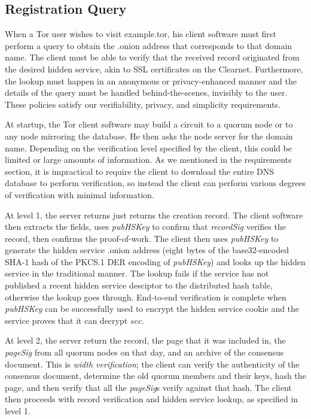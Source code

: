 \subsection{Registration Query}

When a Tor user wishes to visit example.tor, his client software must first perform a query to obtain the .onion address that corresponds to that domain name. The client must be able to verify that the received record originated from the desired hidden service, akin to SSL certificates on the Clearnet. Furthermore, the lookup must happen in an anonymous or privacy-enhanced manner and the details of the query must be handled behind-the-scenes, invisibly to the user. These policies satisfy our verifiability, privacy, and simplicity requirements.

At startup, the Tor client software may build a circuit to a quorum node or to any node mirroring the database. He then asks the node server for the domain name. Depending on the verification level specified by the client, this could be limited or large amounts of information. As we mentioned in the requirements section, it is impractical to require the client to download the entire DNS database to perform verification, so instead the client can perform various degrees of verification with minimal information.

At level 1, the server returns just returns the creation record. The client software then extracts the fields, uses \emph{pubHSKey} to confirm that \emph{recordSig} verifies the record, then confirms the proof-of-work. The client then uses \emph{pubHSKey} to generate the hidden service .onion address (eight bytes of the base32-encoded SHA-1 hash of the PKCS.1 DER encoding of \emph{pubHSKey}) and looks up the hidden service in the traditional manner. The lookup fails if the service has not published a recent hidden service desciptor to the distributed hash table, otherwise the lookup goes through. End-to-end verification is complete when \emph{pubHSKey} can be successfully used to encrypt the hidden service cookie and the service proves that it can decrypt $ sec $.

At level 2, the server return the record, the page that it was included in, the \emph{pageSig} from all quorum nodes on that day, and an archive of the consensus document. This is \emph{width verification}; the client can verify the authenticity of the consensus document, determine the old quorum members and their keys, hash the page, and then verify that all the \emph{pageSig}s verify against that hash. The client then proceeds with record verification and hidden service lookup, as specified in level 1.

